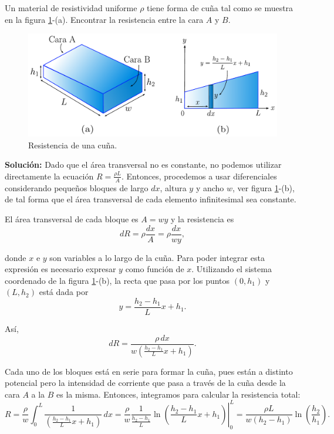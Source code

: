 \begin{ejemplo}
    Un material de resistividad uniforme $\rho$ tiene forma de cuña tal como se muestra en la figura \ref{fig:Ej-1-Calculo-R}-(a). Encontrar la resistencia entre la cara $A$ y $B$.

    \begin{figure}[H]
        \centering
        \includegraphics[scale = 0.7]{Figuras/Ej-1-Calculo-Resistencia.pdf}
        \caption{Resistencia de una cuña.}
        \label{fig:Ej-1-Calculo-R}
    \end{figure}

    \textbf{Solución:} Dado que el área transversal no es constante, no podemos utilizar directamente la ecuación $R = \frac{\rho L}{A}$. Entonces, procedemos a usar diferenciales considerando pequeños bloques de largo $dx$, altura $y$ y ancho $w$, ver figura \ref{fig:Ej-1-Calculo-R}-(b), de tal forma que el área transversal de cada elemento infinitesimal sea constante. 

    El área transversal de cada bloque es $A = wy$ y la resistencia es
    $$dR = \rho \frac{dx}{A} = \rho \frac{dx}{wy},$$

    donde $x$ e $y$ son variables a lo largo de la cuña. Para poder integrar esta expresión es necesario expresar $y$ como función de $x$. Utilizando el sistema coordenado de la figura \ref{fig:Ej-1-Calculo-R}-(b), la recta que pasa por los puntos $(0,h_1)$ y $(L,h_2)$ está dada por
    $$y = \frac{h_2 - h_1}{L}x + h_1.$$

    Así, 
    $$dR = \frac{\rho \,dx}{w \left( \frac{h_2 - h_1}{L}x + h_1\right)}.$$

    Cada uno de los bloques está en serie para formar la cuña, pues están a distinto potencial pero la intensidad de corriente que pasa a través de la cuña desde la cara $A$ a la $B$ es la misma. Entonces, integramos para calcular la resistencia total:
    $$R = \frac{\rho}{w} \int_0^L \frac{1}{\left( \frac{h_2 - h_1}{L}x + h_1\right)}  \,dx =  \left.  \frac{\rho}{w} \frac{1}{\frac{h_2-h_1}{L}} \ln \left(  \frac{h_2 - h_1}{L}x + h_1\right) \right|_0^L = \frac{\rho L}{w(h_2-h_1)} \ln \left(\frac{h_2}{h_1} \right).$$
\end{ejemplo}

